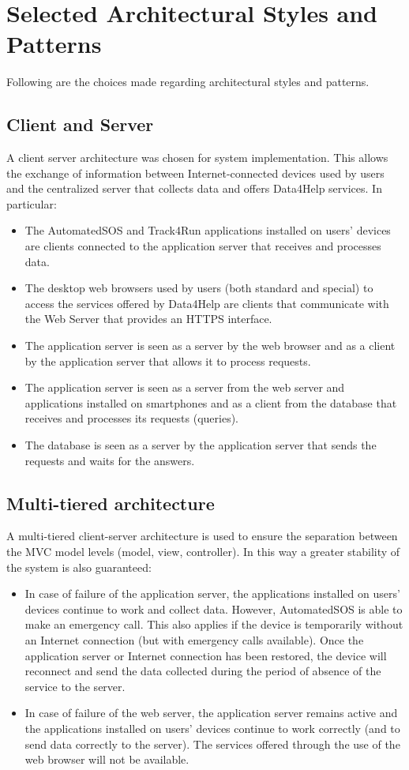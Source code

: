 \section{Selected Architectural Styles and Patterns}\label{architecturalStyle}
Following are the choices made regarding architectural styles and patterns.

\subsection{Client and Server}
A client server architecture was chosen for system implementation.
This allows the exchange of information between Internet-connected devices used by users and the centralized server that collects data and offers Data4Help services.
In particular:
\begin{itemize}
  \item The AutomatedSOS and Track4Run applications installed on users' devices are clients connected to the application server that receives and processes data.
  \item The desktop web browsers used by users (both standard and special) to access the services offered by Data4Help are clients that communicate with the Web Server that provides an HTTPS interface.
  \item The application server is seen as a server by the web browser and as a client by the application server that allows it to process requests.
  \item The application server is seen as a server from the web server and applications installed on smartphones and as a client from the database that receives and processes its requests (queries).
  \item The database is seen as a server by the application server that sends the requests and waits for the answers.
\end{itemize}

\subsection{Multi-tiered architecture}
A multi-tiered client-server architecture is used to ensure the separation between the MVC model levels (model, view, controller).
In this way a greater stability of the system is also guaranteed:
\begin{itemize}
  \item In case of failure of the application server, the applications installed on users' devices continue to work and collect data. However, AutomatedSOS is able to make an emergency call. This also applies if the device is temporarily without an Internet connection (but with emergency calls available). Once the application server or Internet connection has been restored, the device will reconnect and send the data collected during the period of absence of the service to the server.
  \item In case of failure of the web server, the application server remains active and the applications installed on users' devices continue to work correctly (and to send data correctly to the server). The services offered through the use of the web browser will not be available.
\end{itemize}

